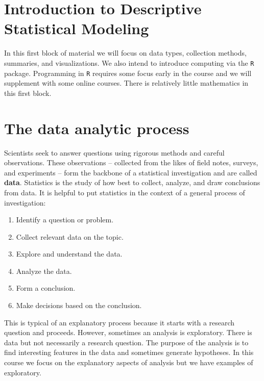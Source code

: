 \documentclass[
]{book}
\begin{document}
\hypertarget{introduction-to-descriptive-statistical-modeling}{%
\section{Introduction to Descriptive Statistical Modeling}\label{introduction-to-descriptive-statistical-modeling}}

In this first block of material we will focus on data types, collection methods, summaries, and visualizations. We also intend to introduce computing via the \texttt{R} package. Programming in \texttt{R} requires some focus early in the course and we will supplement with some online courses. There is relatively little mathematics in this first block.

\hypertarget{the-data-analytic-process}{%
\section{The data analytic process}\label{the-data-analytic-process}}

Scientists seek to answer questions using rigorous methods and careful observations. These observations -- collected from the likes of field notes, surveys, and experiments -- form the backbone of a statistical investigation and are called \textbf{data}. Statistics is the study of how best to collect, analyze, and draw conclusions from data. It is helpful to put statistics in the context of a general process of investigation:

\begin{enumerate}
\def\labelenumi{\arabic{enumi}.}
\item
  Identify a question or problem.
\item
  Collect relevant data on the topic.
\item
  Explore and understand the data.
\item
  Analyze the data.
\item
  Form a conclusion.
\item
  Make decisions based on the conclusion.
\end{enumerate}

This is typical of an explanatory process because it starts with a research question and proceeds. However, sometimes an analysis is exploratory. There is data but not necessarily a research question. The purpose of the analysis is to find interesting features in the data and sometimes generate hypotheses. In this course we focus on the explanatory aspects of analysis but we have examples of exploratory.
\end{document}
